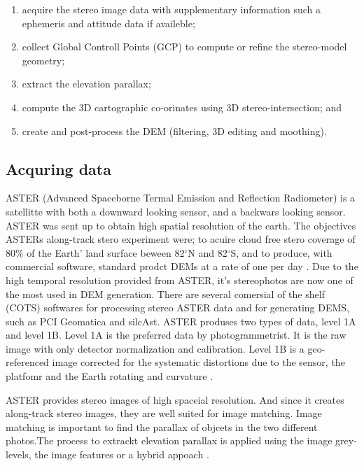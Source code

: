 \documentclass[a4paper,UKenglish]{article}
\begin{document}
\begin{enumerate}
\item acquire the stereo image data with supplementary information such a ephemeris and attitude data if availeble;
\item collect Global Controll Points (GCP) to compute or refine the stereo-model geometry;
\item extract the elevation parallax;
\item compute the 3D cartographic co-orinates using 3D stereo-intersection; and
\item create and post-process the DEM (filtering, 3D editing and moothing).
\end{enumerate}

\subsection{Acquring data}

 ASTER (Advanced Spaceborne Termal Emission and Reflection Radiometer) is a satellitte with both a downward looking sensor, and a backwars looking sensor. ASTER was sent up to obtain high spatial resolution of the earth. The objectives ASTERs along-track stero experiment were; to acuire cloud free stero coverage of 80$\%$ of the Earth' land surface beween 82$^{\circ}$N and 82$^{\circ}$S, and to produce, with commercial software, standard prodct DEMs at a rate of one per day \citep{toutin08}. Due to the high temporal resolution provided from ASTER, it's stereophotos are now one of the most used in DEM generation. There are several comersial of the shelf (COTS) softwares for processing stereo ASTER data and for generating DEMS, such as PCI Geomatica and silcAst. ASTER produses two types of data, level 1A and level 1B. Level 1A is the preferred data by photogrammetrist. It is the raw image with only detector normalization and calibration. Level 1B is a geo-referenced image corrected for the systematic distortions due to the sensor, the platfomr and the Earth rotating and curvature \citep{toutin01}. 

 ASTER provides stereo images of high spaceial resolution. And since it creates along-track stereo images, they are well suited for image matching. Image matching is important to find the parallax of objcets in the two different photos.The process to extrackt elevation parallax is applied using the image grey-levels, the image features or a hybrid appoach \citep{toutin08}. 
\end{document}
